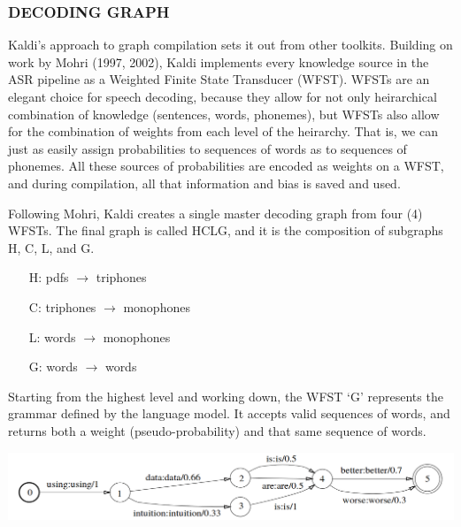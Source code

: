 \documentclass[10pt,a4paper]{article}
\begin{document}
    

\subsubsection*{DECODING GRAPH}

Kaldi's approach to graph compilation sets it out from other toolkits. Building on work by Mohri (1997, 2002), Kaldi implements every knowledge source in the ASR pipeline as a Weighted Finite State Transducer (WFST). WFSTs are an elegant choice for speech decoding, because they allow for not only heirarchical combination of knowledge (sentences, words, phonemes), but WFSTs also allow for the combination of weights from each level of the heirarchy. That is, we can just as easily assign probabilities to sequences of words as to sequences of phonemes. All these sources of probabilities are encoded as weights on a WFST, and during compilation, all that information and bias is saved and used.

Following Mohri, Kaldi creates a single master decoding graph from four (4) WFSTs. The final graph is called HCLG, and it is the composition of subgraphs H, C, L, and G.


\begin{enumerate}
\item[H:] pdfs $\rightarrow$ triphones
\item[C:] triphones $\rightarrow$ monophones
\item[L:] words $\rightarrow$ monophones
\item[G:] words $\rightarrow$ words
\end{enumerate}


Starting from the highest level and working down, the WFST `G' represents the grammar defined by the language model. It accepts valid sequences of words, and returns both a weight (pseudo-probability) and that same sequence of words.


\begin{center}
  \includegraphics[width=.9\textwidth,keepaspectratio]{figs/mohri-G.png}
\end{center}
\end{document}
